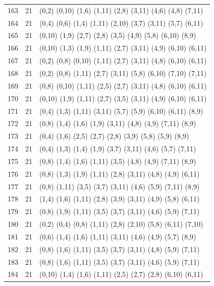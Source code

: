 \begin{appendix}
{\begin{longtable}{lll}
163& 21 & (0,2)   (0,10) (1,6)  (1,11)  (2,8)   (3,11)  (4,6)   (4,8)   (7,11)\\
164& 21 & (0,4)   (0,6)  (1,4)  (1,11)  (2,10)  (3,7)   (3,11)  (5,7)   (6,11)\\
165& 21 & (0,10)  (1,9)  (2,7)  (2,8)   (3,5)   (4,9)   (5,8)   (6,10)  (8,9)\\
166& 21 & (0,10)  (1,3)  (1,9)  (1,11)  (2,7)   (3,11)  (4,9)   (6,10)  (6,11)\\
167& 21 & (0,2)   (0,8)  (0,10) (1,11)  (2,7)   (3,11)  (4,8)   (6,10)  (6,11)\\
168& 21 & (0,2)   (0,8)  (1,11) (2,7)   (3,11)  (5,8)   (6,10)  (7,10)  (7,11)\\
169& 21 & (0,8)   (0,10) (1,11) (2,5)   (2,7)   (3,11)  (4,8)   (6,10)  (6,11)\\
170& 21 & (0,10)  (1,9)  (1,11) (2,7)   (3,5)   (3,11)  (4,9)   (6,10)  (6,11)\\
171& 21 & (0,4)   (1,3)  (1,11) (3,11)  (5,7)   (5,9)   (6,10)  (6,11)  (8,9)\\
172& 21 & (0,8)   (1,4)  (1,6)  (1,9)   (3,11)  (4,8)   (4,9)   (7,11)  (8,9)\\
173& 21 & (0,4)   (1,6)  (2,5)  (2,7)   (2,8)   (3,9)   (5,8)   (5,9)   (8,9)\\
174& 21 & (0,4)   (1,3)  (1,4)  (1,9)   (3,7)   (3,11)  (4,6)   (5,7)   (7,11)\\
175& 21 & (0,8)   (1,4)  (1,6)  (1,11)  (3,5)   (4,8)   (4,9)   (7,11)  (8,9)\\
176& 21 & (0,8)   (1,3)  (1,9)  (1,11)  (2,8)   (3,11)  (4,8)   (4,9)   (6,11)\\
177& 21 & (0,8)   (1,11) (3,5)  (3,7)   (3,11)  (4,6)   (5,9)   (7,11)  (8,9)\\
178& 21 & (1,4)   (1,6)  (1,11) (2,8)   (3,9)   (3,11)  (4,9)   (5,8)   (6,11)\\
179& 21 & (0,8)   (1,9)  (1,11) (3,5)   (3,7)   (3,11)  (4,6)   (5,9)   (7,11)\\
180& 21 & (0,2)   (0,4)  (0,8)  (1,11)  (2,8)   (2,10)  (5,8)   (6,11)  (7,10)\\
181& 21 & (0,6)   (1,4)  (1,6)  (1,11)  (3,11)  (4,6)   (4,9)   (5,7)   (8,9)\\
182& 21 & (0,8)   (1,6)  (1,11) (3,5)   (3,7)   (3,11)  (4,8)   (5,9)   (7,11)\\
183& 21 & (0,8)   (1,6)  (1,11) (3,5)   (3,7)   (3,11)  (4,6)   (5,9)   (7,11)\\
184& 21 & (0,10)  (1,4)  (1,6)  (1,11)  (2,5)   (2,7)   (2,8)   (6,10)  (6,11)\\

\end{longtable}}
\end{appendix}
